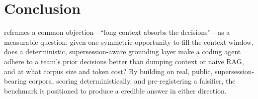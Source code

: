\section{Conclusion}

\benchname{} reframes a common objection---``long context absorbs the
decisions''---as a measurable question: given one symmetric opportunity to fill
the context window, does a deterministic, supersession-aware grounding layer make
a coding agent adhere to a team's prior decisions better than dumping context or
naive RAG, and at what corpus size and token cost? By building on real, public,
supersession-bearing corpora, scoring deterministically, and pre-registering a
falsifier, the benchmark is positioned to produce a credible answer in either
direction. 
